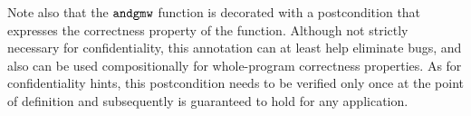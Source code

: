 Note also that the $\texttt{andgmw}$ function is decorated with a
postcondition that expresses the correctness property of the
function. Although not strictly necessary for confidentiality, this
annotation can at least help eliminate bugs, and also can be used
compositionally for whole-program correctness properties. As for
confidentiality hints, this postcondition needs to be verified only
once at the point of definition and subsequently is guaranteed to hold
for any application.
